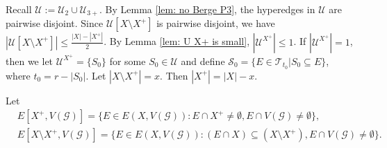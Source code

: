 \documentclass[12pt]{article}%
\newcommand{\mg}{\mathcal{G}}
\begin{document}
\par
Recall $\mathcal{U}:=\mathcal{U}_2\cup \mathcal{U}_{3+}$. By Lemma \ref{lem: no Berge P3}, the hyperedges in $\mathcal{U}$ are pairwise disjoint.
Since $\mathcal{U}[X\setminus X^+]$ is pairwise disjoint, we have $|\mathcal{U}[X\setminus X^+]|\leq \frac{|X|-|X^+|}{2}$.
By Lemma \ref{lem: U X+ is small}, $|\mathcal{U}^{X^+}|\leq 1$. If $|\mathcal{U}^{X^+}|= 1$, then we let $\mathcal{U}^{X^+}=\{S_0\}$ for some $S_0\in\mathcal{U}$ and define $\mathcal{S}_{0}=\{E\in \mathcal{T}_{t_0}|S_0\subseteq E\}$, where $t_0=r-|S_{0}|$.  Let $|X\setminus X^+|=x$. Then $|X^+|=|X|-x$.
\par
Let
\begin{equation*}
    \begin{aligned}
        &E[X^{+},V(\mg)]=\{E\in E(X,V(\mg)): E\cap X^{+}\neq \emptyset, E\cap V(\mg)\neq \emptyset\},\\
        &E[X\setminus X^{+},V(\mg)]=\{E\in E(X,V(\mg)):(E\cap X)\subseteq (X\setminus X^{+}), E\cap V(\mg)\neq \emptyset\}.
    \end{aligned}
\end{equation*}
\end{document}
